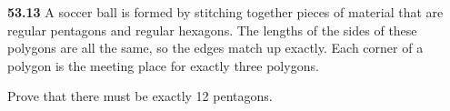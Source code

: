 \documentclass[10pt]{article}
\begin{document}
\pagebreak

\begin{framed}
    \textbf{53.13} A soccer ball is formed by stitching together pieces of
    material that are regular pentagons and regular hexagons. The lengths
    of the sides of these polygons are all the same, so the edges match up
    exactly. Each corner of a polygon is the meeting place for exactly three
    polygons.

    Prove that there must be exactly 12 pentagons.
\end{framed}
\end{document}
